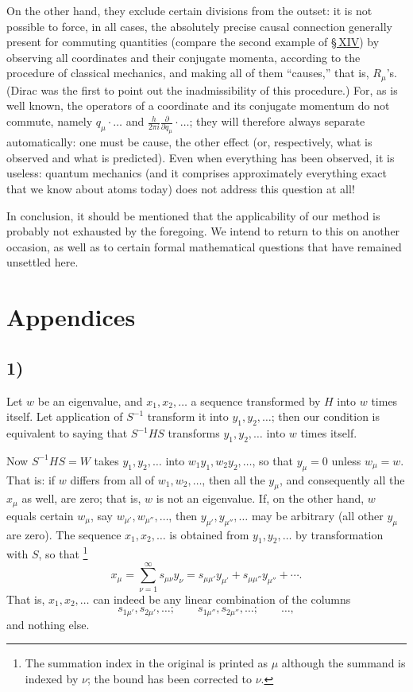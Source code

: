 \documentclass[fontsize=13pt,paper=b5,twoside,bookmarkpackage=false]{scrartcl}
\makeatletter
\newcommand{\majorheading}[2]{%
  \section*{#1}\label{heading:#2}%
  \Hy@writebookmark{}{#1}{\@currentHref}{0}{toc}}
\newcommand{\appendixheading}[1]{%
  \subsection*{#1)}\label{app:#1}%
  \Hy@writebookmark{}{Appendix #1}{\@currentHref}{1}{toc}}
\newcommand{\Sec}[1]{\hyperref[sec:#1]{\S\,#1}}
\newcounter{translatornote}
\newcommand{\tnote}[1]{%
  \begingroup\stepcounter{translatornote}%
  \renewcommand{\thefootnote}{T\arabic{translatornote}}%
  \footnote[0]{#1}\endgroup}
\makeatother
\begin{document}
On the other hand, they exclude certain divisions from the outset: it is not possible to force, in all cases, the absolutely precise causal connection generally present for commuting quantities (compare the second example of \Sec{XIV}) by observing all coordinates and their conjugate momenta, according to the procedure of classical mechanics, and making all of them ``causes,'' that is, $R_\mu$'s. (Dirac was the first to point out the inadmissibility of this procedure.) For, as is well known, the operators of a coordinate and its conjugate momentum do not commute, namely $q_\mu\cdot\ldots$ and $\frac{h}{2\pi i}\frac{\partial}{\partial q_\mu}\cdot\ldots$; they will therefore always separate automatically: one must be cause, the other effect (or, respectively, what is observed and what is predicted). Even when everything has been observed, it is useless: quantum mechanics (and it comprises approximately everything exact that we know about atoms today) does not address this question at all!

In conclusion, it should be mentioned that the applicability of our method is probably not exhausted by the foregoing. We intend to return to this on another occasion, as well as to certain formal mathematical questions that have remained unsettled here.

\majorheading{Appendices}{appendices}
\appendixheading{1}
Let $w$ be an eigenvalue, and $x_1,x_2,\ldots$ a sequence transformed by $H$ into $w$ times itself. Let application of $S^{-1}$ transform it into $y_1,y_2,\ldots$; then our condition is equivalent to saying that $S^{-1}HS$ transforms $y_1,y_2,\ldots$ into $w$ times itself.

Now $S^{-1}HS=W$ takes $y_1,y_2,\ldots$ into $w_1y_1,w_2y_2,\ldots$, so that $y_\mu=0$ unless $w_\mu=w$. That is: if $w$ differs from all of $w_1,w_2,\ldots$, then all the $y_\mu$, and consequently all the $x_\mu$ as well, are zero; that is, $w$ is not an eigenvalue. If, on the other hand, $w$ equals certain $w_\mu$, say $w_{\mu'},w_{\mu''},\ldots$, then $y_{\mu'},y_{\mu''},\ldots$ may be arbitrary (all other $y_\mu$ are zero). The sequence $x_1,x_2,\ldots$ is obtained from $y_1,y_2,\ldots$ by transformation with $S$, so that\tnote{The summation index in the original is printed as $\mu$ although the summand is indexed by $\nu$; the bound has been corrected to $\nu$.}
\[
 x_\mu=\sum_{\nu=1}^{\infty}s_{\mu\nu}y_\nu
 =s_{\mu\mu'}y_{\mu'}+s_{\mu\mu''}y_{\mu''}+\cdots.
\]
That is, $x_1,x_2,\ldots$ can indeed be any linear combination of the columns
\[
s_{1\mu'},s_{2\mu'},\ldots;\qquad
s_{1\mu''},s_{2\mu''},\ldots;\qquad\ldots,
\]
and nothing else.
\end{document}

